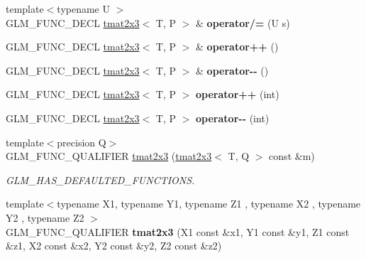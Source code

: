 \begin{DoxyCompactItemize}
\item 
\hypertarget{structglm_1_1tmat2x3_a38e2ae75159a10a3d8883771a3329b29}{{\footnotesize template$<$typename U $>$ }\\G\-L\-M\-\_\-\-F\-U\-N\-C\-\_\-\-D\-E\-C\-L \hyperlink{structglm_1_1tmat2x3}{tmat2x3}$<$ T, P $>$ \& {\bfseries operator/=} (U s)}\label{structglm_1_1tmat2x3_a38e2ae75159a10a3d8883771a3329b29}

\item 
\hypertarget{structglm_1_1tmat2x3_a13841004a80585a9af1e91ed4413b678}{G\-L\-M\-\_\-\-F\-U\-N\-C\-\_\-\-D\-E\-C\-L \hyperlink{structglm_1_1tmat2x3}{tmat2x3}$<$ T, P $>$ \& {\bfseries operator++} ()}\label{structglm_1_1tmat2x3_a13841004a80585a9af1e91ed4413b678}

\item 
\hypertarget{structglm_1_1tmat2x3_a5d7a0f908e4ac53b0caad27168cf9d12}{G\-L\-M\-\_\-\-F\-U\-N\-C\-\_\-\-D\-E\-C\-L \hyperlink{structglm_1_1tmat2x3}{tmat2x3}$<$ T, P $>$ \& {\bfseries operator-\/-\/} ()}\label{structglm_1_1tmat2x3_a5d7a0f908e4ac53b0caad27168cf9d12}

\item 
\hypertarget{structglm_1_1tmat2x3_aadd0bc2be76fb70f799aa6988aa2f5a6}{G\-L\-M\-\_\-\-F\-U\-N\-C\-\_\-\-D\-E\-C\-L \hyperlink{structglm_1_1tmat2x3}{tmat2x3}$<$ T, P $>$ {\bfseries operator++} (int)}\label{structglm_1_1tmat2x3_aadd0bc2be76fb70f799aa6988aa2f5a6}

\item 
\hypertarget{structglm_1_1tmat2x3_a1bc6bd0e64ef98585c680a9365614f7c}{G\-L\-M\-\_\-\-F\-U\-N\-C\-\_\-\-D\-E\-C\-L \hyperlink{structglm_1_1tmat2x3}{tmat2x3}$<$ T, P $>$ {\bfseries operator-\/-\/} (int)}\label{structglm_1_1tmat2x3_a1bc6bd0e64ef98585c680a9365614f7c}

\item 
\hypertarget{structglm_1_1tmat2x3_afb43a1d554a16750b2f42ebe95579a86}{{\footnotesize template$<$precision Q$>$ }\\G\-L\-M\-\_\-\-F\-U\-N\-C\-\_\-\-Q\-U\-A\-L\-I\-F\-I\-E\-R \hyperlink{structglm_1_1tmat2x3_afb43a1d554a16750b2f42ebe95579a86}{tmat2x3} (\hyperlink{structglm_1_1tmat2x3}{tmat2x3}$<$ T, Q $>$ const \&m)}\label{structglm_1_1tmat2x3_afb43a1d554a16750b2f42ebe95579a86}

\begin{DoxyCompactList}\small\item\em G\-L\-M\-\_\-\-H\-A\-S\-\_\-\-D\-E\-F\-A\-U\-L\-T\-E\-D\-\_\-\-F\-U\-N\-C\-T\-I\-O\-N\-S. \end{DoxyCompactList}\item 
\hypertarget{structglm_1_1tmat2x3_a4f672209b320ae6873092fa44331c220}{{\footnotesize template$<$typename X1, typename Y1, typename Z1 , typename X2 , typename Y2 , typename Z2 $>$ }\\G\-L\-M\-\_\-\-F\-U\-N\-C\-\_\-\-Q\-U\-A\-L\-I\-F\-I\-E\-R {\bfseries tmat2x3} (X1 const \&x1, Y1 const \&y1, Z1 const \&z1, X2 const \&x2, Y2 const \&y2, Z2 const \&z2)}\label{structglm_1_1tmat2x3_a4f672209b320ae6873092fa44331c220}


\end{DoxyCompactItemize}
